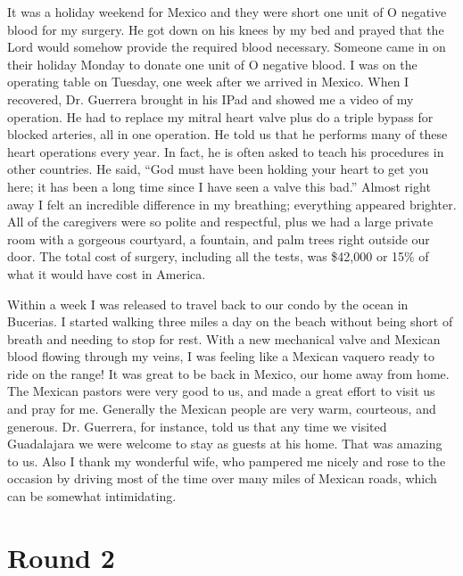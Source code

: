 \documentclass[twoside, 12pt]{book}
\begin{document}
It was a holiday weekend for Mexico and they were short one unit of O negative blood for my surgery. He got down on his knees by my bed and prayed that the Lord would somehow provide the required blood necessary. Someone came in on their holiday Monday to donate one unit of O negative blood. I was on the operating table on Tuesday, one week after we arrived in Mexico. When I recovered, Dr. Guerrera brought in his IPad and showed me a video of my operation. He had to replace my mitral heart valve plus do a triple bypass for blocked arteries, all in one operation. He told us that he performs many of these heart operations every year. In fact, he is often asked to teach his procedures in other countries. He said, “God must have been holding your heart to get you here; it has been a long time since I have seen a valve this bad.” Almost right away I felt an incredible difference in my breathing; everything appeared brighter.  All of the caregivers were so polite and respectful, plus we had a large private room with a gorgeous courtyard, a fountain, and palm trees right outside our door. The total cost of surgery, including all the tests, was \$42,000 or 15\% of what it would have cost in America. 

Within a week I was released to travel back to our condo by the ocean in Bucerias. I started walking three miles a day on the beach without being short of breath and needing to stop for rest. With a new mechanical valve and Mexican blood flowing through my veins, I was feeling like a Mexican vaquero ready to ride on the range! It was great to be back in Mexico, our home away from home. The Mexican pastors were very good to us, and made a great effort to visit us and pray for me. Generally the Mexican people are very warm, courteous, and generous. Dr. Guerrera, for instance, told us that any time we visited Guadalajara we were welcome to stay as guests at his home. That was amazing to us. Also I thank my wonderful wife, who pampered me nicely and rose to the occasion by driving most of the time over many miles of Mexican roads, which can be somewhat intimidating.


\section{Round 2}
\
\end{document}
